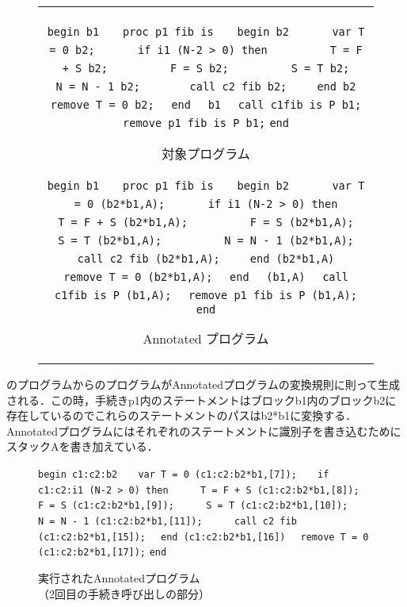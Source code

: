 \documentclass[submit,PRO]{ipsj}
\def\|{\verb|}
\begin{document}
\begin{figure}[tb]
\begin{center}
\begin{tabular}{c}
\begin{minipage}[t]{0.5\columnwidth}
\footnotesize
\setbox0\vbox{
\hbox{\|begin b1|}
\hbox{\|   proc p1 fib is|}
\hbox{\|   begin b2|}
\hbox{\|      var T = 0 b2;|}
\hbox{\|      if i1 (N-2 > 0) then|}
\hbox{\|         T = F + S b2;|}
\hbox{\|         F = S b2;|}
\hbox{\|         S = T b2;|}
\hbox{\|         N = N - 1 b2;|}
\hbox{\|       call c2 fib b2;|}
\hbox{\|    end b2|}
\hbox{\|    remove T = 0 b2;|}
\hbox{\|  end|}
\hbox{\|  b1|}
\hbox{\|  call c1fib is P b1;|}
\hbox{\|  remove p1 fib is P b1;|}
\hbox{\|end|}
}
\centerline{\fbox{\box0}}
\caption{対象プログラム}
\ecaption{Original Program}
\label{fig:Horiginal}
\end{minipage}

\begin{minipage}[t]{0.5\columnwidth}
\footnotesize
\setbox0\vbox{
\hbox{\|begin b1|}
\hbox{\|   proc p1 fib is|}
\hbox{\|   begin b2|}
\hbox{\|      var T = 0 (b2*b1,A);|}
\hbox{\|      if i1 (N-2 > 0) then|}
\hbox{\|         T = F + S (b2*b1,A);|}
\hbox{\|         F = S (b2*b1,A);|}
\hbox{\|         S = T (b2*b1,A);|}
\hbox{\|         N = N - 1 (b2*b1,A);|}
\hbox{\|       call c2 fib (b2*b1,A);|}
\hbox{\|    end (b2*b1,A)|}
\hbox{\|    remove T = 0 (b2*b1,A);|}
\hbox{\|  end|}
\hbox{\|  (b1,A)|}
\hbox{\|  call c1fib is P (b1,A);|}
\hbox{\|  remove p1 fib is P (b1,A);|}
\hbox{\|end|}
}
\centerline{\fbox{\box0}}
\caption{Annotated プログラム}
\ecaption{Annotated Program}
\label{fig:Hannotated}
\end{minipage}
\end{tabular}
\end{center}
\end{figure}

のプログラムからのプログラムがAnnotatedプログラムの変換規則に則って生成される．この時，手続きp1内のステートメントはブロックb1内のブロックb2に存在しているのでこれらのステートメントのパスはb2*b1に変換する．Annotatedプログラムにはそれぞれのステートメントに識別子を書き込むためにスタックAを書き加えている．


\begin{figure}[tb]
\vbox{
\hbox{\|begin c1:c2:b2|}
\hbox{\|   var T = 0 (c1:c2:b2*b1,[7]);|}
\hbox{\|   if c1:c2:i1 (N-2 > 0) then|}
\hbox{\|     T = F + S (c1:c2:b2*b1,[8]);|}
\hbox{\|     F = S (c1:c2:b2*b1,[9]);|}
\hbox{\|     S = T (c1:c2:b2*b1,[10]);|}
\hbox{\|     N = N - 1 (c1:c2:b2*b1,[11]);|}
\hbox{\|     call c2 fib (c1:c2:b2*b1,[15]);|}
\hbox{\|  end (c1:c2:b2*b1,[16])|}
\hbox{\|  remove T = 0 (c1:c2:b2*b1,[17]);|}
\hbox{\|end|}
}
\centerline{}
\caption{実行されたAnnotatedプログラム\\
（2回目の手続き呼び出しの部分）}
\label{fig:Hexec}
\end{figure}
\end{document}
